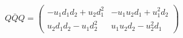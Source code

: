 \begin{equation}
Q\bar{Q} Q= \left( \begin{array}{cc}
 -u_1d_1d_2+u_2 d_1^2 & -u_1u_2d_1 + u_1^2 d_2  \\
u_2d_1d_2 -u_1d_2^2  & u_1u_2d_2 - u_2^2 d_1 
\end{array} \right)    \label{eq:central}
\end{equation}

